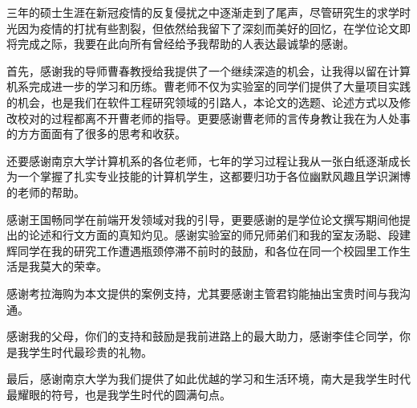\documentclass[winfonts,master,twoside]{njuthesis}
\begin{document}


\begin{acknowledgement}

    三年的硕士生涯在新冠疫情的反复侵扰之中逐渐走到了尾声，尽管研究生的求学时光因为疫情的打扰有些割裂，但依然给我留下了深刻而美好的回忆，在学位论文即将完成之际，我要在此向所有曾经给予我帮助的人表达最诚挚的感谢。

    首先，感谢我的导师曹春教授给我提供了一个继续深造的机会，让我得以留在计算机系完成进一步的学习和历练。曹老师不仅为实验室的同学们提供了大量项目实践的机会，也是我们在软件工程研究领域的引路人，本论文的选题、论述方式以及修改校对的过程都离不开曹老师的指导。更要感谢曹老师的言传身教让我在为人处事的方方面面有了很多的思考和收获。

    还要感谢南京大学计算机系的各位老师，七年的学习过程让我从一张白纸逐渐成长为一个掌握了扎实专业技能的计算机学生，这都要归功于各位幽默风趣且学识渊博的老师的帮助。

    感谢王国畅同学在前端开发领域对我的引导，更要感谢的是学位论文撰写期间他提出的论述和行文方面的真知灼见。感谢实验室的师兄师弟们和我的室友汤聪、段建辉同学在我的研究工作遭遇瓶颈停滞不前时的鼓励，和各位在同一个校园里工作生活是我莫大的荣幸。

    感谢考拉海购为本文提供的案例支持，尤其要感谢主管君钧能抽出宝贵时间与我沟通。

    感谢我的父母，你们的支持和鼓励是我前进路上的最大助力，感谢李佳仑同学，你是我学生时代最珍贵的礼物。

    最后，感谢南京大学为我们提供了如此优越的学习和生活环境，南大是我学生时代最耀眼的符号，也是我学生时代的圆满句点。

\end{acknowledgement}










\backmatter
\end{document}
